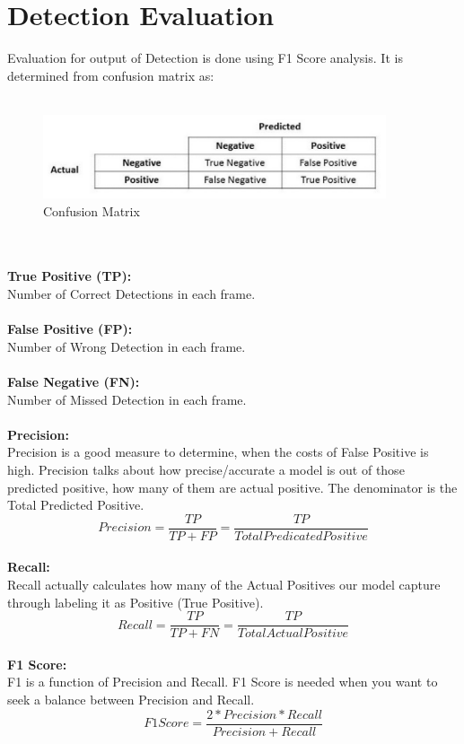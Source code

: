         \section{Detection Evaluation}
            Evaluation for output of Detection is done using F1 Score analysis. It is determined from confusion matrix as:\\\\
            \begin{figure}[h]
                \centering
                \includegraphics[width=0.90\textwidth]{img/confusion_matrix.png}
                \caption{Confusion Matrix}
            \end{figure}\\\\
            \textbf{True Positive (TP):}\\
                Number of Correct Detections in each frame.\\\\
            \textbf{False Positive (FP):}\\
                Number of Wrong Detection in each frame.\\\\
            \textbf{False Negative (FN):}\\
                Number of Missed Detection in each frame.\\\\
            \textbf{Precision:}\\
                Precision is a good measure to determine, when the costs of False Positive is high. Precision talks about how precise/accurate a model is out of those predicted positive, how many of them are actual positive. The denominator is the Total Predicted Positive.
                $$Precision =\frac{TP}{TP+FP}=\frac{TP}{Total Predicated Positive}$$\\
            \textbf{Recall:}\\
                Recall actually calculates how many of the Actual Positives our model capture through labeling it as Positive (True Positive). 
                $$Recall =\frac{TP}{TP+FN}=\frac{TP}{Total Actual Positive}$$\\
            \textbf{F1 Score:}\\
                F1 is a function of Precision and Recall. F1 Score is needed when you want to seek a balance between Precision and Recall.\\
                $$F1 Score = \frac{2 * Precision * Recall}{Precision + Recall}$$
                \pagebreak
